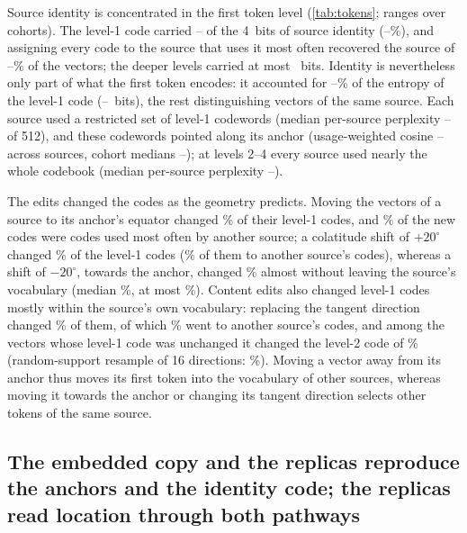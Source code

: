 \documentclass[10pt,letterpaper]{article}
\begin{document}
Source identity is concentrated in the first token level (\cref{tab:tokens}; ranges over
cohorts). The level-1 code carried \MILevelOneMin--\MILevelOneMax{} of the 4~bits of source
identity (\MIShareLevelOneMin--\MIShareLevelOneMax\%), and assigning every code to the source
that uses it most often recovered the source of \SourceAccLevelOneMin--\SourceAccLevelOneMax\%
of the vectors; the deeper levels carried at most \MIDeepMax{}~bits. Identity is nevertheless
only part of what the first token encodes: it accounted for
\MIShareCodeLevelOneMin--\MIShareCodeLevelOneMax\% of the entropy of the level-1 code
(\CodeEntropyLevelOneMin--\CodeEntropyLevelOneMax~bits), the rest distinguishing vectors of the
same source. Each source used a restricted set of level-1 codewords (median per-source
perplexity \PerplexLevelOneMin--\PerplexLevelOneMax{} of 512), and these codewords pointed along
its anchor (usage-weighted cosine \CodewordCosMin--\CodewordCosMax{} across sources, cohort
medians \CodewordCosMedianMin--\CodewordCosMedianMax); at levels 2--4 every
source used nearly the whole codebook (median per-source perplexity
\PerplexDeepMin--\PerplexDeepMax).



The edits changed the codes as the geometry predicts. Moving the vectors of a source to its
anchor's equator changed \FlipZeroLevelOne\% of their level-1 codes, and \ForeignZero\% of the
new codes were codes used most often by another source; a colatitude shift of $+20^\circ$
changed \FlipColatPTwentyLevelOne\% of the level-1 codes (\ForeignColatPTwenty\% of them to
another source's codes), whereas a shift of $-20^\circ$, towards the anchor, changed
\FlipColatMTwentyLevelOne\% almost without leaving the source's vocabulary (median
\ForeignColatMTwenty\%, at most \ForeignColatMTwentyMax\%).
Content edits also changed level-1 codes mostly within the source's own vocabulary: replacing
the tangent direction changed \FlipTangentLevelOne\% of them, of which \ForeignTangent\% went to
another source's codes, and among the vectors whose level-1 code was unchanged it changed the
level-2 code of \DeeperTangentLevelTwo\% (random-support resample of 16 directions:
\DeeperRandSixteenLevelTwo\%). Moving a vector away from its anchor thus moves its first token into
the vocabulary of other sources, whereas moving it towards the anchor or changing its tangent
direction selects other tokens of the same source.


\subsection*{The embedded copy and the replicas reproduce the anchors and the identity code; the replicas
read location through both pathways}\label{sec:res-replication}
\end{document}
